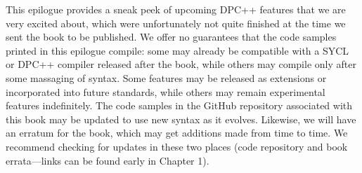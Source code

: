 This epilogue provides a sneak peek of upcoming DPC++ features that we are very excited about, which were unfortunately not quite finished at the time we sent the book to be published. We offer no guarantees that the code samples printed in this epilogue compile: some may already be compatible with a SYCL or DPC++ compiler released after the book, while others may compile only after some massaging of syntax. Some features may be released as extensions or incorporated into future standards, while others may remain experimental features indefinitely. The code samples in the GitHub repository associated with this book may be updated to use new syntax as it evolves. Likewise, we will have an erratum for the book, which may get additions made from time to time. We recommend checking for updates in these two places (code repository and book errata—links can be found early in Chapter 1).\par
